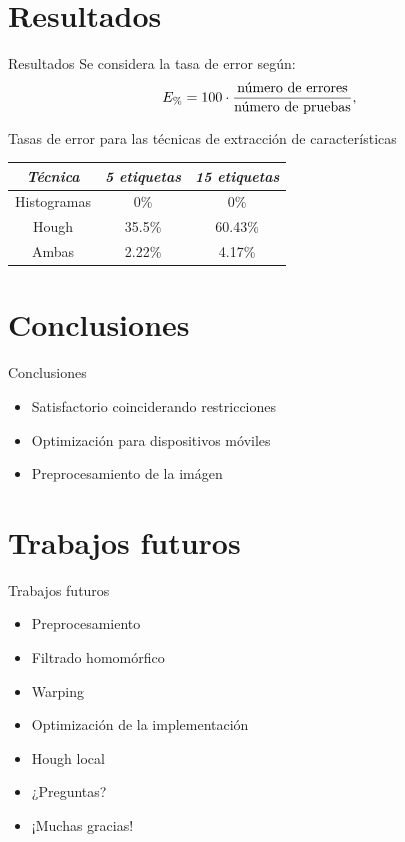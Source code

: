 \documentclass[spanish]{beamer}
\begin{document}
\section{Resultados}
\begin{frame}{Resultados}
  Se considera la tasa de error según:
  \begin{equation*}
    E_{\%}=100\cdot\frac{\textrm{número de errores}}{\textrm{número de pruebas}},
  \end{equation*}

  Tasas de error para las técnicas de extracción de características
  \begin{center}\begin{tabular}{ccc}
      \hline \emph{{Técnica}} & \emph{5 etiquetas} & \emph{15 etiquetas}\\
      \hline Histogramas & 0\% & 0\%\\
      \hline Hough & 35.5\% & 60.43\%\\
      \hline Ambas & 2.22\% & 4.17\%\\
      \hline
  \end{tabular}\end{center}
\end{frame}
%
\section{Conclusiones}
\begin{frame}{Conclusiones}
  \begin{itemize}
  \item Satisfactorio coinciderando restricciones
  \item Optimización para dispositivos móviles
  \item Preprocesamiento de la imágen
  \end{itemize}
\end{frame}
%
\section{Trabajos futuros}
\begin{frame}{Trabajos futuros}
  \begin{itemize}
  \item Preprocesamiento
  \item Filtrado homomórfico
  \item Warping
  \item Optimización de la implementación
  \item Hough local
  \end{itemize}
\end{frame}
\begin{frame}{}
  \begin{itemize}
  \item<1-1> ¿Preguntas?
  \item<2-2> ¡Muchas gracias!
  \end{itemize}
\end{frame}
\end{document}
